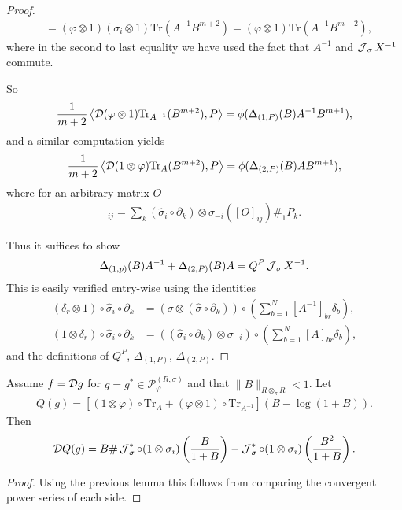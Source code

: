\begin{proof}
\begin{align*}
			&=(\varphi\otimes 1)(\sigma_i\otimes 1)\text{Tr}(A^{-1} B^{m+2})=(\varphi\otimes 1)\text{Tr}(A^{-1} B^{m+2}),
	\end{align*}
where in the second to last equality we have used the fact that $A^{-1}$ and $\operatorname{\mathcal J}_\sigma X^{-1}$ commute.\par
So 
	\begin{align*}
		\frac{1}{m+2}\left\langle\mathcal D(\varphi\otimes 1)\text{Tr}_{A^{-1}}(B^{m+2}), P\right\rangle = \phi(\Delta_{(1,P)}(B)A^{-1}B^{m+1}),
	\end{align*}
and a similar computation yields
	\begin{align*}
		\frac{1}{m+2}\left\langle\mathcal D(1\otimes \varphi)\text{Tr}_{A}(B^{m+2}), P\right\rangle = \phi(\Delta_{(2,P)}(B)A B^{m+1}),
	\end{align*}
where for an arbitrary matrix $O$
	\begin{align*}
		[\Delta_{(2,P)}(O)]_{ij}= \sum_k (\hat{\sigma}_i\circ\partial_k)\otimes \sigma_{-i} ([O]_{ij})\#_1 P_k.
	\end{align*}\par
Thus it suffices to show
	\begin{align*}
		\Delta_{(1,p)}(B)A^{-1}+\Delta_{(2,P)}(B)A = Q^P \operatorname{\mathcal J}_\sigma X^{-1}.
	\end{align*}
This is easily verified entry-wise using the identities
	\begin{align*}
		(\delta_r\otimes 1)\circ\hat{\sigma}_i\circ\partial_k&= (\sigma\otimes (\hat{\sigma}\circ\partial_k))\circ\left(\sum_{b=1}^N [A^{-1}]_{br}\delta_b\right),\\
		(1\otimes \delta_r)\circ\hat{\sigma}_i\circ\partial_k&=((\hat{\sigma}_i\circ\partial_k)\otimes\sigma_{-i})\circ\left(\sum_{b=1}^N [A]_{br}\delta_b\right),
	\end{align*}
and the definitions of $Q^P$, $\Delta_{(1,P)}$, $\Delta_{(2,P)}$.
\end{proof}


\begin{lem}\label{Q}
Assume $f=\mathcal D g$ for $g=g^*\in \mathscr{P}_\varphi^{(R,\sigma)}$ and that $\|B\|_{R\otimes_\pi R}<1$. Let
	\begin{align*}
		Q(g)=\left[(1\otimes\varphi)\circ\text{Tr}_{A}+(\varphi\otimes 1)\circ\text{Tr}_{A^{-1}}\right](B-\log(1+B)).
	\end{align*}
Then
	\begin{equation*}
		\mathcal D Q(g)=B\# \operatorname{\mathcal J}_\sigma^*\circ(1\otimes\sigma_i)\left(\frac{B}{1+B}\right) - \operatorname{\mathcal J}_\sigma^*\circ(1\otimes\sigma_i)\left(\frac{B^2}{1+B}\right).
	\end{equation*}
\end{lem}
\begin{proof}
Using the previous lemma this follows from comparing the convergent power series of each side.
\end{proof}

